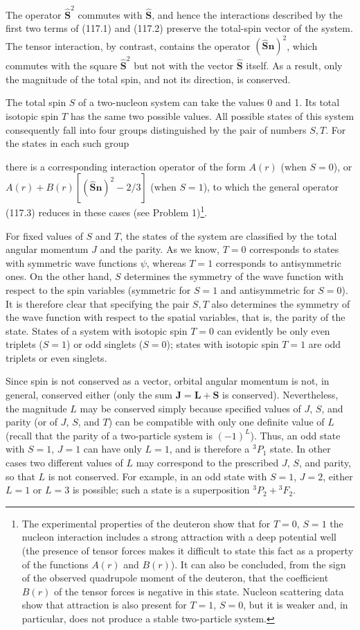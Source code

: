 The operator $\hat{\mathbf S}^2$ commutes with $\hat{\mathbf S}$, and hence
the interactions described by the first two terms of (117.1) and (117.2)
preserve the total-spin vector of the system. The tensor interaction, by
contrast, contains the operator $(\hat{\mathbf S}\mathbf n)^2$, which
commutes with the square $\hat{\mathbf S}^2$ but not with the vector
$\hat{\mathbf S}$ itself. As a result, only the magnitude of the total spin,
and not its direction, is conserved.

The total spin $S$ of a two-nucleon system can take the values 0 and 1. Its
total isotopic spin $T$ has the same two possible values. All possible states
of this system consequently fall into four groups distinguished by the pair
of numbers $S,T$. For the states in each such group

there is a corresponding interaction operator of the form $A(r)$ (when
$S=0$), or
$A(r)+B(r)[(\hat{\mathbf S}\mathbf n)^2-2/3]$ (when $S=1$), to which the
general operator (117.3) reduces in these cases (see Problem 1)\footnote{The
experimental properties of the deuteron show that for $T=0$, $S=1$ the
nucleon interaction includes a strong attraction with a deep potential well
(the presence of tensor forces makes it difficult to state this fact as a
property of the functions $A(r)$ and $B(r)$). It can also be concluded, from
the sign of the observed quadrupole moment of the deuteron, that the
coefficient $B(r)$ of the tensor forces is negative in this state. Nucleon
scattering data show that attraction is also present for $T=1$, $S=0$, but it
is weaker and, in particular, does not produce a stable two-particle system.}.

For fixed values of $S$ and $T$, the states of the system are classified by
the total angular momentum $J$ and the parity. As we know, $T=0$ corresponds
to states with symmetric wave functions $\psi$, whereas $T=1$ corresponds to
antisymmetric ones. On the other hand, $S$ determines the symmetry of the wave
function with respect to the spin variables (symmetric for $S=1$ and
antisymmetric for $S=0$). It is therefore clear that specifying the pair
$S,T$ also determines the symmetry of the wave function with respect to the
spatial variables, that is, the parity of the state. States of a system with
isotopic spin $T=0$ can evidently be only even triplets ($S=1$) or odd
singlets ($S=0$); states with isotopic spin $T=1$ are odd triplets or even
singlets.

Since spin is not conserved as a vector, orbital angular momentum is not, in
general, conserved either (only the sum $\mathbf J=\mathbf L+\mathbf S$ is
conserved). Nevertheless, the magnitude $L$ may be conserved simply because
specified values of $J$, $S$, and parity (or of $J$, $S$, and $T$) can be
compatible with only one definite value of $L$ (recall that the parity of a
two-particle system is $(-1)^L$). Thus, an odd state with $S=1$, $J=1$ can
have only $L=1$, and is therefore a ${}^3P_1$ state. In other cases two
different values of $L$ may correspond to the prescribed $J$, $S$, and
parity, so that $L$ is not conserved. For example, in an odd state with
$S=1$, $J=2$, either $L=1$ or $L=3$ is possible; such a state is a
superposition ${}^3P_2+{}^3F_2$.

